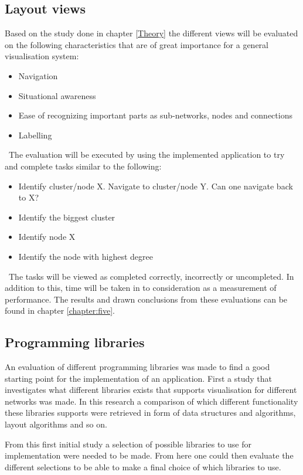 \documentclass[a4paper,11pt]{kth-mag}
\begin{document}
\subsection{Layout views}
\label{sec:evaluation:layoutviews}
Based on the study done in chapter \ref{Theory} the different views will be evaluated on the following characteristics that are of great importance for a general visualisation system:\
\begin{itemize}
	\item{Navigation}
	\item{Situational awareness}
	\item{Ease of recognizing important parts as sub-networks, nodes and connections}
	\item{Labelling}
\end{itemize}
\
The evaluation will be executed by using the implemented application to try and complete tasks similar to the following:\
\begin{itemize}
	\item{Identify cluster/node X. Navigate to cluster/node Y. Can one navigate back to X?}
	\item{Identify the biggest cluster}
	\item{Identify node X}
	\item{Identify the node with highest degree}
\end{itemize}
\
The tasks will be viewed as completed correctly, incorrectly or uncompleted. In addition to this, time will be taken in to consideration as a measurement of performance. The results and drawn conclusions from these evaluations
can be found in chapter \ref{chapter:five}.
\subsection{Programming libraries}
\label{sec:evaluation:libraries}
An evaluation of different programming libraries was made to find a good starting point for the implementation of an application. First a study that investigates what different libraries exists that supports visualisation 
for different networks was made. In this research a comparison of which different functionality these libraries supports were retrieved in form of data structures and algorithms, layout algorithms and so on.

From this first initial study a selection of possible libraries to use for implementation were needed to be made. From here one could then evaluate the different selections to be able to make a final choice
 of which libraries to use.
\end{document}
